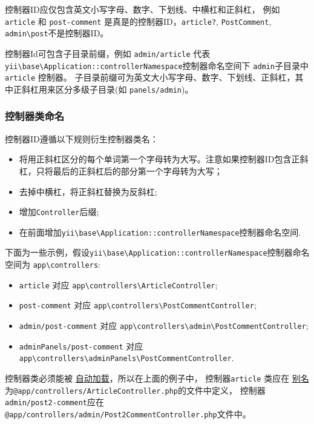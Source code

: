 控制器ID应仅包含英文小写字母、数字、下划线、中横杠和正斜杠，
例如 \lstinline|article| 和 \lstinline|post-comment| 是真是的控制器ID，\lstinline|article?|, \lstinline|PostComment|, \lstinline|admin\post|不是控制器ID。

控制器Id可包含子目录前缀，例如 \lstinline|admin/article| 代表
\texttt{yii{\allowbreak{}\textbackslash}base{\allowbreak{}\textbackslash}Application\allowbreak{}::\allowbreak{}controllerNamespace}控制器命名空间下 \lstinline|admin|子目录中 \lstinline|article| 控制器。
子目录前缀可为英文大小写字母、数字、下划线、正斜杠，其中正斜杠用来区分多级子目录(如 \lstinline|panels/admin|)。

\subsubsection{控制器类命名 \label{structure-controllers.md::controller-class-naming}}
控制器ID遵循以下规则衍生控制器类名：

\begin{itemize}
\item 将用正斜杠区分的每个单词第一个字母转为大写。注意如果控制器ID包含正斜杠，只将最后的正斜杠后的部分第一个字母转为大写；
\item 去掉中横杠，将正斜杠替换为反斜杠;
\item 增加\lstinline|Controller|后缀;
\item 在前面增加\texttt{yii{\allowbreak{}\textbackslash}base{\allowbreak{}\textbackslash}Application\allowbreak{}::\allowbreak{}controllerNamespace}控制器命名空间.
\end{itemize}
下面为一些示例，假设\texttt{yii{\allowbreak{}\textbackslash}base{\allowbreak{}\textbackslash}Application\allowbreak{}::\allowbreak{}controllerNamespace}控制器命名空间为 \lstinline|app\controllers|:

\begin{itemize}
\item \lstinline|article| 对应 \lstinline|app\controllers\ArticleController|;
\item \lstinline|post-comment| 对应 \lstinline|app\controllers\PostCommentController|;
\item \lstinline|admin/post-comment| 对应 \lstinline|app\controllers\admin\PostCommentController|;
\item \lstinline|adminPanels/post-comment| 对应 \lstinline|app\controllers\adminPanels\PostCommentController|.
\end{itemize}
控制器类必须能被 \hyperref[concept-autoloading.md]{自动加载}，所以在上面的例子中，
控制器\lstinline|article| 类应在 \hyperref[concept-aliases.md]{别名} 为\lstinline|@app/controllers/ArticleController.php|的文件中定义，
控制器\lstinline|admin/post2-comment|应在\lstinline|@app/controllers/admin/Post2CommentController.php|文件中。

